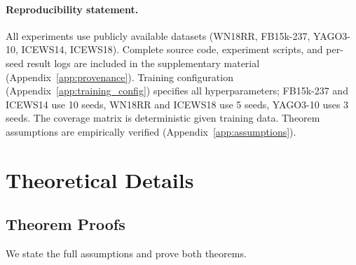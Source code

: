 \documentclass{article}
\begin{document}
\paragraph{Reproducibility statement.}
All experiments use publicly available datasets (WN18RR, FB15k-237, YAGO3-10, ICEWS14, ICEWS18). Complete source code, experiment scripts, and per-seed result logs are included in the supplementary material (Appendix~\ref{app:provenance}). Training configuration (Appendix~\ref{app:training_config}) specifies all hyperparameters; FB15k-237 and ICEWS14 use 10 seeds, WN18RR and ICEWS18 use 5 seeds, YAGO3-10 uses 3 seeds. The coverage matrix is deterministic given training data. Theorem assumptions are empirically verified (Appendix~\ref{app:assumptions}).

\begingroup
\sloppy
\setlength{\emergencystretch}{4em}
\raggedright

\endgroup

\newpage

\appendix

\section{Theoretical Details}
\label{app:theory}

\subsection{Theorem Proofs}
\label{app:proof}

We state the full assumptions and prove both theorems.
\end{document}
